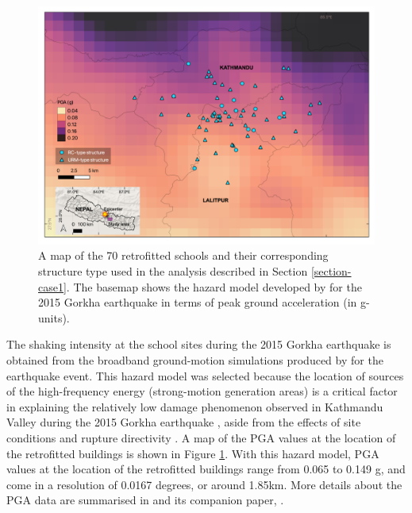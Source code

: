\begin{figure}[h!] 
\begin{center}
    \includegraphics[width=\linewidth]{Figures/Dataset_Case1.png}
	\caption{A map of the 70 retrofitted schools and their corresponding structure type used in the analysis described in Section \ref{section-case1}. The basemap shows the hazard model developed by \cite{chen20192015} for the 2015 Gorkha earthquake in terms of peak ground acceleration (in g-units).}
	\label{fig:datacase1}
\end{center}
\end{figure}

The shaking intensity at the school sites during the 2015 Gorkha earthquake is obtained from the broadband ground-motion simulations produced by \cite{chen20192015} for the earthquake event. This hazard model was selected because the location of sources of the high-frequency energy (strong-motion generation areas) is a critical factor in explaining the relatively low damage phenomenon observed in Kathmandu Valley during the 2015 Gorkha earthquake \citep{gallovivc2016modeling, koketsu2016widespread}, aside from the effects of site conditions and rupture directivity \citep{dixit2015strong, rajaure2017characterizing, gallovivc2016modeling, koketsu2016widespread}. A map of the PGA values at the location of the retrofitted buildings is shown in Figure \ref{fig:datacase1}. With this hazard model, PGA values at the location of the retrofitted buildings range from 0.065 to 0.149 g, and come in a resolution of 0.0167 degrees, or around 1.85km.  More details about the PGA data are summarised in \cite{chen20192015} and its companion paper, \cite{wei20182015}.

